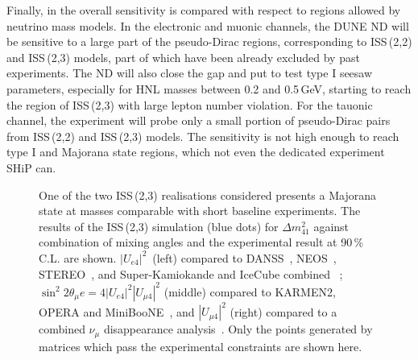 Finally, in  the overall sensitivity is compared with respect to regions allowed by neutrino mass models.
In the electronic and muonic channels, the DUNE ND will be sensitive to a large part of the pseudo-Dirac regions, %
corresponding to ISS\,(2,2) and ISS\,(2,3) models, %
part of which have been already excluded by past experiments.
The ND will also close the gap and put to test type I seesaw parameters, especially for HNL masses between 0.2 and 0.5\,GeV, %
starting to reach the region of ISS\,(2,3) with large lepton number violation.
For the tauonic channel, the experiment will probe only a small portion %
of pseudo-Dirac pairs from ISS\,(2,2) and ISS\,(2,3) models.
The sensitivity is not high enough to reach type I and Majorana state regions, which not even the dedicated experiment SHiP can.

\begin{figure}
	\centering
	{\resizebox{\linewidth}{!}{}}
	\caption[Comparison of ISS(2,3) with short baseline anomalies]%
		{One of the two ISS\,(2,3) realisations considered presents a Majorana state at masses comparable with short baseline experiments.
		The results of the ISS\,(2,3) simulation (blue dots) for $\Delta m_{4 1}^2$ against combination of mixing angles and %
		the experimental result at 90\,\% C.L. are shown.
		$|U_{e 4}|^2$~(left) compared %
		to DANSS~\cite{Alekseev:2018efk}, NEOS~\cite{Ko:2016owz}, STEREO~\cite{AlmazanMolina:2019qul}, %
		and Super-Kamiokande and IceCube combined ~\cite{Dentler:2018sju};
		\mbox{$\sin^2 2\theta{_\mu e} = 4|U_{e 4}|^2|U_{\mu 4}|^2$} (middle) compared to KARMEN2, OPERA and MiniBooNE~\cite{Aguilar-Arevalo:2018gpe},
		and $|U_{\mu 4}|^2$ (right) compared to a combined $\nu_\mu$ disappearance analysis~\cite{Dentler:2018sju}.
		Only the points generated by matrices which pass the experimental constraints are shown here.}
	\label{fig:sblosc}
\end{figure}

